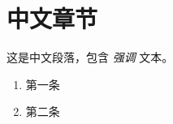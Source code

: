 \documentclass{article}
\begin{document}
\section{中文章节}
这是中文段落，包含 \emph{强调} 文本。
\begin{enumerate}
\item 第一条
\item 第二条
\end{enumerate}
\end{document}
